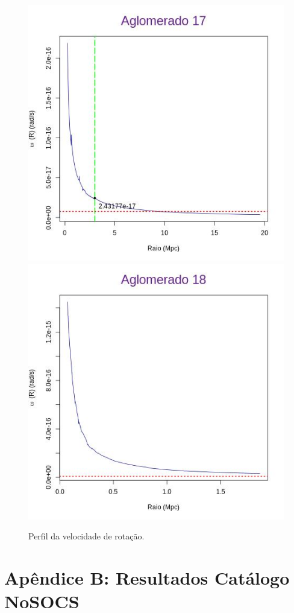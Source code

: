 \begin{apendicesenv}
\begin{figure}[H]
\begin{center}
\includegraphics[scale=.3]{04-figuras/selec20/perfil17}
\includegraphics[scale=.3]{04-figuras/selec20/perfil18}
\caption{Perfil da velocidade de rotação.}
\label{fig6}%
\end{center}
\end{figure}


\chapter{Apêndice B: Resultados Catálogo NoSOCS}
\label{chap:apendicenosocs}


\end{apendicesenv}